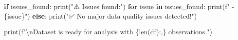 \documentclass[
  letterpaper,
  DIV=11,
  numbers=noendperiod]{scrartcl}
\newenvironment{Shaded}{\begin{snugshade}}{\end{snugshade}}
\newcommand{\BuiltInTok}[1]{\textcolor[rgb]{0.00,0.23,0.31}{#1}}
\newcommand{\CharTok}[1]{\textcolor[rgb]{0.13,0.47,0.30}{#1}}
\newcommand{\ControlFlowTok}[1]{\textcolor[rgb]{0.00,0.23,0.31}{\textbf{#1}}}
\newcommand{\KeywordTok}[1]{\textcolor[rgb]{0.00,0.23,0.31}{\textbf{#1}}}
\newcommand{\NormalTok}[1]{\textcolor[rgb]{0.00,0.23,0.31}{#1}}
\newcommand{\SpecialCharTok}[1]{\textcolor[rgb]{0.37,0.37,0.37}{#1}}
\newcommand{\SpecialStringTok}[1]{\textcolor[rgb]{0.13,0.47,0.30}{#1}}
\newcommand{\StringTok}[1]{\textcolor[rgb]{0.13,0.47,0.30}{#1}}
\begin{document}
\begin{Shaded}
\begin{Highlighting}[]
\ControlFlowTok{if}\NormalTok{ issues\_found:}
    \BuiltInTok{print}\NormalTok{(}\StringTok{"⚠️ Issues found:"}\NormalTok{)}
    \ControlFlowTok{for}\NormalTok{ issue }\KeywordTok{in}\NormalTok{ issues\_found:}
        \BuiltInTok{print}\NormalTok{(}\SpecialStringTok{f"   {-} }\SpecialCharTok{\{}\NormalTok{issue}\SpecialCharTok{\}}\SpecialStringTok{"}\NormalTok{)}
\ControlFlowTok{else}\NormalTok{:}
    \BuiltInTok{print}\NormalTok{(}\StringTok{"✅ No major data quality issues detected!"}\NormalTok{)}

\BuiltInTok{print}\NormalTok{(}\SpecialStringTok{f"}\CharTok{\textbackslash{}n}\SpecialStringTok{Dataset is ready for analysis with }\SpecialCharTok{\{}\BuiltInTok{len}\NormalTok{(df)}\SpecialCharTok{:,\}}\SpecialStringTok{ observations."}\NormalTok{)}
\end{Highlighting}
\end{Shaded}
\end{document}
